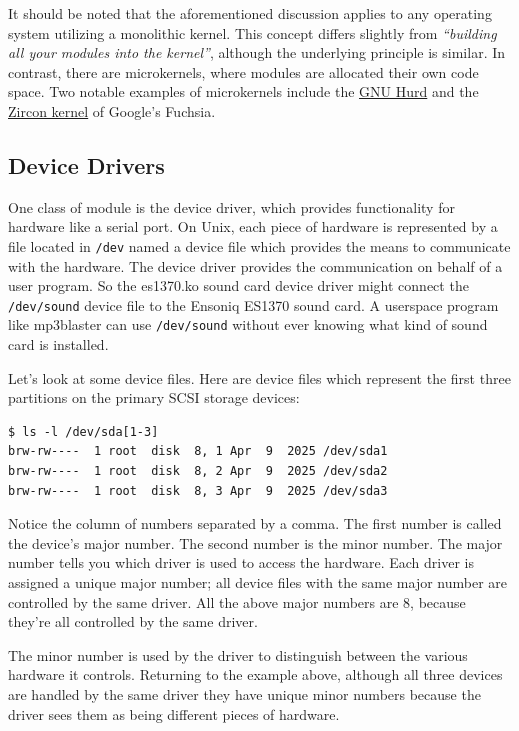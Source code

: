 \documentclass[10pt, oneside]{book}
\begin{document}
It should be noted that the aforementioned discussion applies to any operating system utilizing a monolithic kernel.
This concept differs slightly from \emph{``building all your modules into the kernel''},
although the underlying principle is similar.
In contrast, there are microkernels, where modules are allocated their own code space.
Two notable examples of microkernels include the \href{https://www.gnu.org/software/hurd/}{GNU Hurd} and the \href{https://fuchsia.dev/fuchsia-src/concepts/kernel}{Zircon kernel} of Google's Fuchsia.

\subsection{Device Drivers}
\label{sec:device_drivers}
One class of module is the device driver, which provides functionality for hardware like a serial port.
On Unix, each piece of hardware is represented by a file located in \verb|/dev| named a device file which provides the means to communicate with the hardware.
The device driver provides the communication on behalf of a user program.
So the es1370.ko sound card device driver might connect the \verb|/dev/sound| device file to the Ensoniq ES1370 sound card.
A userspace program like mp3blaster can use \verb|/dev/sound| without ever knowing what kind of sound card is installed.

Let's look at some device files.
Here are device files which represent the first three partitions on the primary SCSI storage devices:

\begin{verbatim}
$ ls -l /dev/sda[1-3]
brw-rw----  1 root  disk  8, 1 Apr  9  2025 /dev/sda1
brw-rw----  1 root  disk  8, 2 Apr  9  2025 /dev/sda2
brw-rw----  1 root  disk  8, 3 Apr  9  2025 /dev/sda3
\end{verbatim}

Notice the column of numbers separated by a comma.
The first number is called the device's major number.
The second number is the minor number.
The major number tells you which driver is used to access the hardware.
Each driver is assigned a unique major number; all device files with the same major number are controlled by the same driver.
All the above major numbers are 8, because they're all controlled by the same driver.

The minor number is used by the driver to distinguish between the various hardware it controls.
Returning to the example above, although all three devices are handled by the same driver they have unique minor numbers because the driver sees them as being different pieces of hardware.
\end{document}
